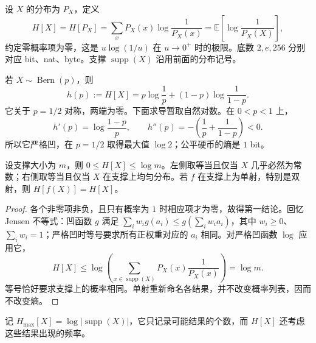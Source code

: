 \documentclass[lang=cn,a4paper,fontset=none,zihao=false,10pt,openany,twoside]{beautybook}
\numberwithin{algorithm}{chapter}
\begin{document}
\begin{definition}[熵]\label{def:entropy}
设 $X$ 的分布为 $P_X$，定义
\[
 H[X]=H[P_X]=\sum_xP_X(x)\log\frac1{P_X(x)}
 =\mathbb E\left[\log\frac1{P_X(X)}\right],
\]
约定零概率项为零，这是 $u\log(1/u)$ 在 $u\to0^+$ 时的极限。底数 $2,e,256$ 分别对应 bit、nat、byte。支撑 $\operatorname{supp}(X)$ 沿用前面的分布记号。
\end{definition}
\begin{example}[二元熵]\label{ex:binary-entropy}
若 $X\sim\operatorname{Bern}(p)$，则
\[
 h(p):=H[X]=p\log\frac1p+(1-p)\log\frac1{1-p}.
\]
它关于 $p=1/2$ 对称，两端为零。下面求导暂取自然对数。在 $0<p<1$ 上，
\[
 h'(p)=\log\frac{1-p}{p},\qquad
 h''(p)=-\left(\frac1p+\frac1{1-p}\right)<0.
\]
所以它严格凹，在 $p=1/2$ 取得最大值 $\log2$；公平硬币的熵是 $1$ bit。
\end{example}
\begin{center}
\end{center}

\begin{proposition}[熵的基本性质]\label{prop:entropy-basic}
设支撑大小为 $m$，则 $0\le H[X]\le\log m$。左侧取等当且仅当 $X$ 几乎必然为常数；右侧取等当且仅当 $X$ 在支撑上均匀分布。若 $f$ 在支撑上为单射，特别是双射，则 $H[f(X)]=H[X]$。
\end{proposition}
\begin{proof}
各个非零项非负，且只有概率为 $1$ 时相应项才为零，故得第一结论。回忆 Jensen 不等式：凹函数 $g$ 满足 $\sum_iw_i g(a_i)\le g(\sum_iw_i a_i)$，其中 $w_i\ge0$、$\sum_iw_i=1$；严格凹时等号要求所有正权重对应的 $a_i$ 相同。对严格凹函数 $\log$ 应用它，
\[
 H[X]\le\log\left(\sum_{x\in\operatorname{supp}(X)}P_X(x)\frac1{P_X(x)}\right)=\log m.
\]
等号恰好要求支撑上的概率相同。单射重新命名各结果，并不改变概率列表，因而不改变熵。
\end{proof}
记 $H_{\max}[X]=\log|\operatorname{supp}(X)|$，它只记录可能结果的个数，而 $H[X]$ 还考虑这些结果出现的频率。
\end{document}
